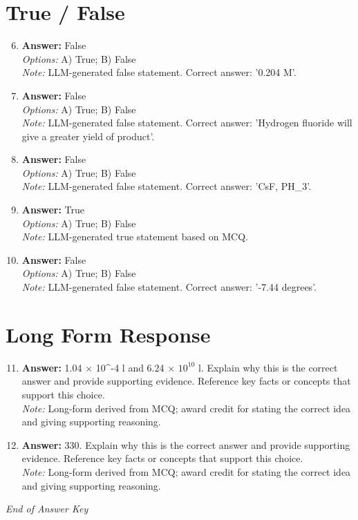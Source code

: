 \documentclass[12pt]{article}
\begin{document}
\section*{True / False}
\begin{enumerate}[label=\arabic*.]
\setcounter{enumi}{5}
\item \textbf{Answer:} False
\\ \textit{Options:} A) True; B) False
\\ \textit{Note:} LLM-generated false statement. Correct answer: '0.204 M'.
\item \textbf{Answer:} False
\\ \textit{Options:} A) True; B) False
\\ \textit{Note:} LLM-generated false statement. Correct answer: 'Hydrogen fluoride will give a greater yield of product'.
\item \textbf{Answer:} False
\\ \textit{Options:} A) True; B) False
\\ \textit{Note:} LLM-generated false statement. Correct answer: 'CsF, PH\_3'.
\item \textbf{Answer:} True
\\ \textit{Options:} A) True; B) False
\\ \textit{Note:} LLM-generated true statement based on MCQ.
\item \textbf{Answer:} False
\\ \textit{Options:} A) True; B) False
\\ \textit{Note:} LLM-generated false statement. Correct answer: '-7.44 degrees'.
\end{enumerate}

\section*{Long Form Response}
\begin{enumerate}[label=\arabic*.]
\setcounter{enumi}{10}
\item \textbf{Answer:} 1.04 \ensuremath{\times} 10^-4 l and 6.24 \ensuremath{\times} $10^10$ l. Explain why this is the correct answer and provide supporting evidence. Reference key facts or concepts that support this choice.
\\ \textit{Note:} Long-form derived from MCQ; award credit for stating the correct idea and giving supporting reasoning.
\item \textbf{Answer:} 330. Explain why this is the correct answer and provide supporting evidence. Reference key facts or concepts that support this choice.
\\ \textit{Note:} Long-form derived from MCQ; award credit for stating the correct idea and giving supporting reasoning.
\end{enumerate}

\vfill
\noindent\textit{End of Answer Key}
\end{document}
